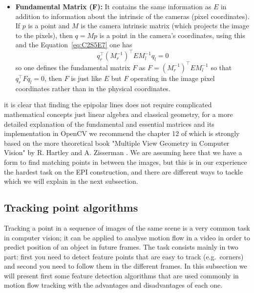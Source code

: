 \begin{itemize}
\item \textbf{Fundamental Matrix (F):} It contains the same information as $E$ in addition to information about the intrinsic of the cameras (pixel coordinates). If $p$ is a point and $M$ is the camera intrinsic matrix (which projects the image to the pixels), then $q=Mp$ is a point in the camera's coordinates, using this and the Equation~\ref{eq:C2S5E7} one has 
\begin{equation}
\label{eq:C2S5E8}
q_r^{\intercal}(M_r^{-1})^{\intercal}E M_l^{-1}q_l=0
\end{equation}
so one defines the fundamental matrix $F$ as $F=(M_r^{-1})^{\intercal}EM_l^{-1}$ so that $q_r^{\intercal}Fq_l=0$, then $F$ is just like $E$ but $F$ operating in the image pixel coordinates rather than in the physical coordinates.
\end{itemize}
it is clear that finding the epipolar lines does not require complicated mathematical concepts just linear algebra and classical geometry, for a more detailed explanation of the fundamental and essential matrices and its implementation in OpenCV we recommend the chapter 12 of \cite{LearnOpenCV} which is strongly based on the more theoretical book "Multiple View Geometry in Computer Vision" by R. Hartley and A. Zisserman \cite{MultipleView}. We are assuming here that we have a form to find matching points in between the images, but this is in our experience the hardest task on the EPI construction, and there are different ways to tackle which we will explain in the next subsection. 

\subsection{Tracking point algorithms}

Tracking a point in a sequence of images of the same scene is a very common task in computer vision; it can be applied to analyse motion flow in a video in order to predict position of an object in future frames. The task consists mainly in two part: first you need to detect feature points that are easy to track (e.g.\ corners) and second you need to follow them in the different frames. In this subsection we will present first some feature detection algorithms that are used commonly in motion flow tracking with the advantages and disadvantages of each one. 

